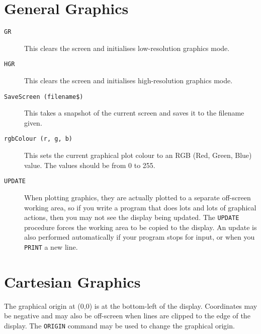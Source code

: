 \section{General Graphics}
\begin{description}
\item[{\tt GR}]
This clears the screen and initialises low-resolution graphics mode.
\item[{\tt HGR}]
This clears the screen and initialises high-resolution graphics mode.
\item[{\tt SaveScreen (filename\$)}]
This takes a snapshot of the current screen and saves it to the filename given.
\item[{\tt rgbColour (r, g, b)}]
This sets the current graphical plot colour to an RGB (Red, Green, Blue)
value. The values should be from 0 to 255.
\item[{\tt UPDATE}]
When plotting graphics, they are actually plotted to a separate off-screen
working area, so if you write a program that does lots and lots of graphical
actions, then you may not see the display being updated. The {\tt UPDATE} procedure
forces the working area to be copied to the display. An update is also
performed automatically if your program stops for input, or when you
{\tt PRINT} a new line.
\end{description}

\section{Cartesian Graphics}
The graphical origin at (0,0) is at the bottom-left of the
display. Coordinates may be negative and may also be off-screen when
lines are clipped to the edge of the display. The {\tt ORIGIN} command
may be used to change the graphical origin.

